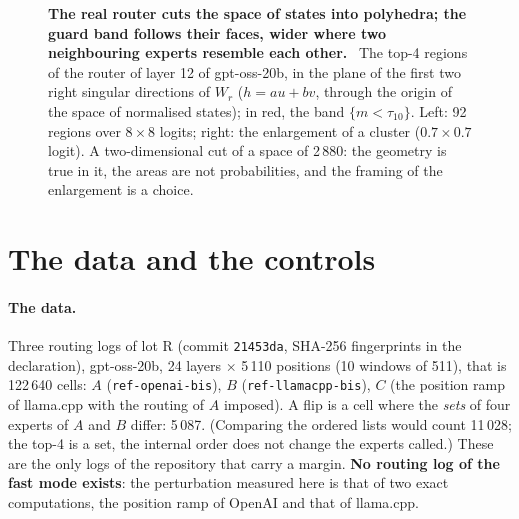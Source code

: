 \begin{figure}[tbp]
\centering
\FigureTropicaleCoupe
\caption[The real polyhedra of the router of layer 12]{\textbf{The real router cuts the space of states into polyhedra; the guard band follows their faces, wider where two neighbouring experts resemble each other.} \calc~The top-4 regions of the router of layer 12 of gpt-oss-20b, in the plane of the first two right singular directions of $W_r$ ($h = a u + b v$, through the origin of the space of normalised states); in red, the band $\{m < \tau_{10}\}$. Left: 92 regions over $8 \times 8$ logits; right: the enlargement of a cluster ($0.7 \times 0.7$ logit). A two-dimensional cut of a space of 2\,880: the geometry is true in it, the areas are not probabilities, and the framing of the enlargement is a choice. \HorsStyle{}}
\label{fig:t3-trop-coupe}
\end{figure}

\section{The data and the controls}\label{t3tro:sec:donnees}

\paragraph{The data.} Three routing logs of lot R (commit \texttt{21453da}, SHA-256 fingerprints in the declaration), gpt-oss-20b, 24 layers $\times$ 5\,110 positions (10 windows of 511), that is 122\,640 cells: $A$ (\texttt{ref-openai-bis}), $B$ (\texttt{ref-llamacpp-bis}), $C$ (the position ramp of llama.cpp with the routing of $A$ imposed). A flip is a cell where the \emph{sets} of four experts of $A$ and $B$ differ: 5\,087. (Comparing the ordered lists would count 11\,028; the top-4 is a set, the internal order does not change the experts called.) These are the only logs of the repository that carry a margin. \textbf{No routing log of the fast mode exists}: the perturbation measured here is that of two exact computations, the position ramp of OpenAI and that of llama.cpp.

